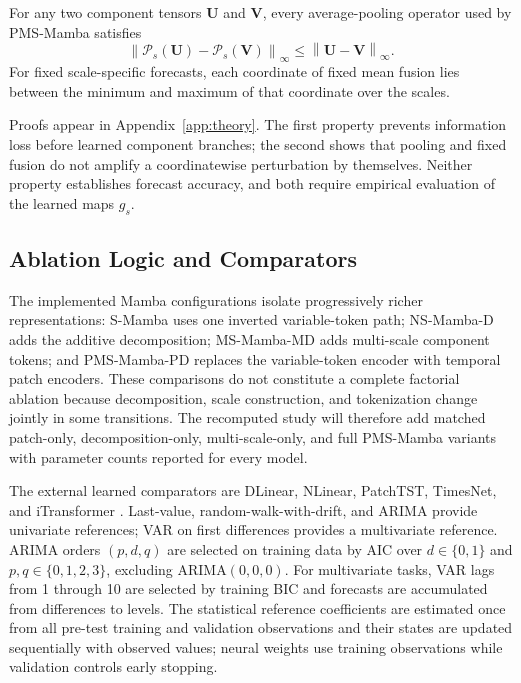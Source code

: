 \begin{proposition}
\label{prop:stable-fusion}
For any two component tensors $\mathbf{U}$ and $\mathbf{V}$, every average-pooling operator used by PMS-Mamba satisfies
\begin{equation}
    \left\|\mathcal{P}_s(\mathbf{U})-\mathcal{P}_s(\mathbf{V})\right\|_{\infty}
    \leq \left\|\mathbf{U}-\mathbf{V}\right\|_{\infty}.
\end{equation}
For fixed scale-specific forecasts, each coordinate of fixed mean fusion lies between the minimum and maximum of that coordinate over the scales.
\end{proposition}

Proofs appear in Appendix~\ref{app:theory}.
The first property prevents information loss before learned component branches; the second shows that pooling and fixed fusion do not amplify a coordinatewise perturbation by themselves.
Neither property establishes forecast accuracy, and both require empirical evaluation of the learned maps $g_s$.

\subsection{Ablation Logic and Comparators}

The implemented Mamba configurations isolate progressively richer representations: S-Mamba uses one inverted variable-token path; NS-Mamba-D adds the additive decomposition; MS-Mamba-MD adds multi-scale component tokens; and PMS-Mamba-PD replaces the variable-token encoder with temporal patch encoders.
These comparisons do not constitute a complete factorial ablation because decomposition, scale construction, and tokenization change jointly in some transitions.
The recomputed study will therefore add matched patch-only, decomposition-only, multi-scale-only, and full PMS-Mamba variants with parameter counts reported for every model.

The external learned comparators are DLinear, NLinear, PatchTST, TimesNet, and iTransformer \cite{dlinear,patchtst,timesnet,itransformer}.
Last-value, random-walk-with-drift, and ARIMA provide univariate references; VAR on first differences provides a multivariate reference.
ARIMA orders $(p,d,q)$ are selected on training data by AIC over $d\in\{0,1\}$ and $p,q\in\{0,1,2,3\}$, excluding ARIMA$(0,0,0)$.
For multivariate tasks, VAR lags from 1 through 10 are selected by training BIC and forecasts are accumulated from differences to levels.
The statistical reference coefficients are estimated once from all pre-test training and validation observations and their states are updated sequentially with observed values; neural weights use training observations while validation controls early stopping.

